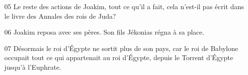 
05 Le reste des actions de Joakim, tout ce qu’il a fait, cela n’est-il pas écrit dans le livre des Annales des rois de Juda?

06 Joakim reposa avec ses pères. Son fils Jékonias régna à sa place.

07 Désormais le roi d’Égypte ne sortit plus de son pays, car le roi de Babylone occupait tout ce qui appartenait au roi d’Égypte, depuis le Torrent d’Égypte jusqu’à l’Euphrate.